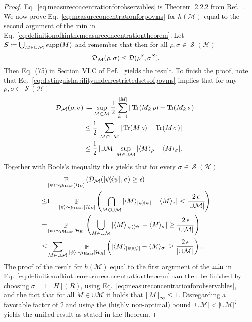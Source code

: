 \documentclass[a4paper,12pt,listof=totoc,index=totoc,bibliography=totoc,headsepline=false,headings=normal,BCOR16.153846mm,DIV12,headinclude,twoside,cleardoublepage=empty,numbers=noenddot,final]{scrreprt}
\theoremstyle{mystyle}
\numberwithin{equation}{section}
\numberwithin{figure}{section}
\numberwithin{lemma}{section}
\numberwithin{theorem}{section}
\numberwithin{corollary}{section}
\numberwithin{definition}{section}
\numberwithin{conjecture}{section}
\numberwithin{observation}{section}
\newcommand{\+}{\mkern2mu}
\newcommand{\coloneqq}{\mathrel{\vcentcolon\mkern-1.2mu=}} %
\newcommand{\union}{\cup}
\newcommand{\texteqref}[1]{Eq.~\eqref{#1}}
\renewcommand{\min}{\mathchoice{\operatorname*{min}}{\operatorname*{min}}{\mathrm{min}}{\mathrm{min}}}
\renewcommand{\H}{H}
\newcommand{\rhomc}{{\sqcap}}
\newcommand{\muhaar}{\mu_{\mathrm{Haar}}}
\newcommand{\bra}[1]{\langle #1|}
\newcommand{\ket}[1]{|#1\rangle}
\newcommand{\ketbra}[2]{\ket{#1}\!\bra{#2}}
\newcommand{\ex}[2]{\langle #1 \rangle_{#2}}
\newcommand{\norm}[2][]{
  \ifthenelse{\equal{#1}{}}
    {\left\| {#2} \right\|}
    {\ifthenelse{\equal{#1}{uinv}}
      {\left\vert\kern-0.25ex\left\vert\kern-0.25ex\left\vert {#2} \right\vert\kern-0.25ex\right\vert\kern-0.25ex\right\vert}
      {\left\| {#2} \right\|_{#1}}
    }
}
\newcommand{\tracedistance}[3][]{
  \ifthenelse{\equal{#2}{}}
  {\ifthenelse{\equal{#3}{}}
    {\mathcal{D}_{#1}}{}
  }{
    \ifthenelse{\equal{#1}{}}
    {\operatorname{\mathcal{D}}(#2,#3)}
    {\operatorname{\mathcal{D}}_{#1}(#2,#3)}
  }
}
\DeclareMathOperator*{\probability}{\mathbb{P}}
\DeclareMathOperator{\1}{\mathds{1}}
\newcommand{\POVMs}{\mathcal{M}}
\DeclareMathOperator{\Qst}{\mathcal{S}}
\DeclareMathOperator{\Tr}{Tr}
\DeclareMathOperator{\supp}{supp}
\newcommand{\mc}[1]{\mathcal{#1}}
\newcommand{\mcH}{\mc{H}}
\begin{document}
\begin{proof}
  \texteqref{eq:measureconcentrationforobservables} is Theorem~2.2.2 from Ref.~\cite{Gogolin10-masterthesis}.
  We now prove \texteqref{eq:measureconcentrationforpovms} for $h(\POVMs)$ equal to the second argument of the $\min$ in \texteqref{eq:definitionofhinthemeasureconcentrationtheorem}.
  Let $S \coloneqq \bigcup_{M \in \union \POVMs} \supp(M)$ and remember that then for all $\rho,\sigma \in \Qst(\mcH)$
  \begin{equation}
    \tracedistance[\POVMs]\rho\sigma \leq \tracedistance{\rho^S}{\sigma^S} .
  \end{equation}
  Then Eq.~(75) in Section~VI.C of Ref.~\cite{Popescu05} yields the result.
  To finish the proof, note that \texteqref{eq:distinguishabilityunderrestrictedsetsofpovms} implies that for any $\rho,\sigma \in \Qst(\mcH)$
  \begin{align} \label{eq:distinguishabilityupperboundforproofofmeasureconcentrationtheorem}
    \tracedistance[\POVMs]\rho\sigma &\coloneqq \sup_{M \in \POVMs} \frac{1}{2}\,\sum_{k=1}^{|M|} |\Tr(M_k\,\rho) - \Tr(M_k\,\sigma)| \\
    &\leq \frac{1}{2}\,\sum_{M \in \union\POVMs } |\Tr(M\,\rho) - \Tr(M\,\sigma)| \\
    &\leq \frac{1}{2}\,|{\union\POVMs}| \sup_{M \in \union\POVMs } |\ex M \rho - \ex M \sigma | .
  \end{align}
  Together with Boole's inequality this yields that for every $\sigma \in \Qst(\mcH)$
  \begin{align}
    &\probability_{\ket\psi\sim\muhaar[\mcH_R]}\left(\tracedistance[\POVMs]{\ketbra\psi\psi}\sigma \geq \epsilon\right) \nonumber\\
    \leq &1 - \probability_{\ket\psi\sim\muhaar[\mcH_R]}\left(\bigcap_{M \in \union\POVMs} |\ex M {\ketbra\psi\psi} - \ex M \sigma |< \frac{2\,\epsilon}{|{\union\POVMs}|} \right) \\
    = &\probability_{\ket\psi\sim\muhaar[\mcH_R]}\left(\bigcup_{M \in \union\POVMs} |\ex M {\ketbra\psi\psi} - \ex M \sigma| \geq \frac{2\,\epsilon}{|{\union\POVMs}|} \right) \\
    \leq &\sum_{M \in \union\POVMs} \probability_{\ket\psi\sim\muhaar[\mcH_R]}\left( |\ex M {\ketbra\psi\psi} - \ex M \sigma| \geq \frac{2\,\epsilon}{|{\union\POVMs}|} \right) .
  \end{align}
  The proof of the result for $h(\POVMs)$ equal to the first argument of the $\min$ in \texteqref{eq:definitionofhinthemeasureconcentrationtheorem} can then be finished by choosing $\sigma = \rhomc[\H](R)$, using \texteqref{eq:measureconcentrationforobservables}, and the fact that for all $M \in \union \POVMs$ it holds that $\norm[\infty]{M} \leq 1$.
  Disregarding a favorable factor of $2$ and using the (highly non-optimal) bound $|{\union\POVMs}| < |{\union\POVMs}|^2$ yields the unified result as stated in the theorem.
\end{proof}
\end{document}
